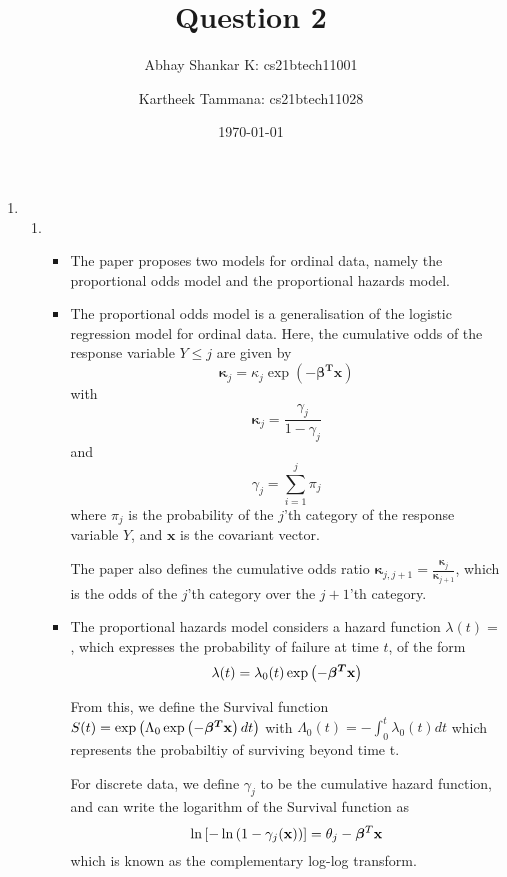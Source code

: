 \documentclass[reqno]{amsart}
\begin{document}
    \title{Question 2}
    \author{Abhay Shankar K: cs21btech11001}
    \author{Kartheek Tammana: cs21btech11028}
    \date{\today}
    
    \maketitle

    \begin{enumerate}[label=\textbf{(\Roman*)}]
        \item \begin{enumerate}[label=\textbf{(\alph*)}]
            \item \begin{itemize}
                \item The paper proposes two models for ordinal data, namely the proportional odds model and the proportional hazards model.
                \item The proportional odds model is a generalisation of the logistic regression model for ordinal data. Here, the cumulative odds of the response variable \(Y \leq j\) are given by 
                \[\boldsymbol{\kappa}_j = \kappa_j \exp (- \boldsymbol{\beta^T} \mathbf{x})\]
                with 
                \[\boldsymbol{\kappa}_j = \frac{\gamma_j}{1 - \gamma_j}\]
                and
                \[\gamma_j = \sum_{i = 1}^{j} \pi_j\]
                where \(\pi_j\) is the probability of the \(j\)'th category of the response variable \(Y\), and \(\mathbf{x}\) is the covariant vector.
                
                The paper also defines the cumulative odds ratio \(\boldsymbol{\kappa}_{j, j + 1} = \frac{\boldsymbol{\kappa}_j}{\boldsymbol{\kappa}_{j + 1}}\), which is the odds of the \(j\)'th category over the \(j + 1\)'th category.
                
                \item The proportional hazards model considers a hazard function \(\lambda(t) = \), which expresses the probability of failure at time \(t\), of the form \[\lambda(t) = \lambda_0(t) \exp \left(- \boldsymbol{\beta^T} \mathbf{x}\right)\]
                
                From this, we define the Survival function \(S(t) = \exp \left(\Lambda_0 \exp \left(- \boldsymbol{\beta^T} \mathbf{x}\right) dt\right)\) with \(\Lambda_0(t) = - \int_{0}^{t} \lambda_0(t) dt \) which represents the probabiltiy of surviving beyond time t.

                For discrete data, we define \(\gamma_j\) to be the cumulative hazard function, and can write the logarithm of the Survival function as \[\ln \left[- \ln \left(1 - \gamma_j(\mathbf{x})\right)\right] = \theta_j - \boldsymbol{\beta}^T \mathbf{x}\] which is known as the complementary log-log transform.



\end{itemize}
\end{enumerate}
\end{enumerate}
\end{document}
